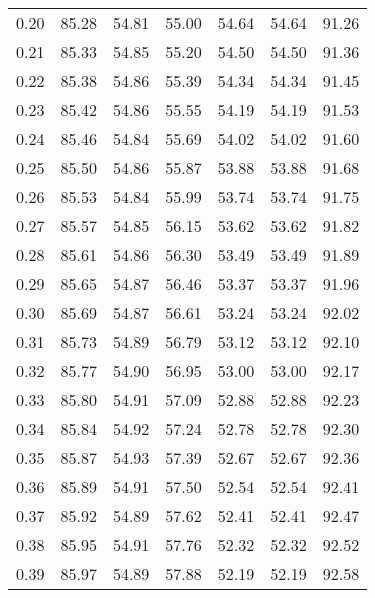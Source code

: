 \begin{tabular}{|c|c|c|c|c|c|c|}
      0.20 &     85.28 &     54.81 &      55.00 &   54.64 &      54.64 &         91.26 \\
      0.21 &     85.33 &     54.85 &      55.20 &   54.50 &      54.50 &         91.36 \\
      0.22 &     85.38 &     54.86 &      55.39 &   54.34 &      54.34 &         91.45 \\
      0.23 &     85.42 &     54.86 &      55.55 &   54.19 &      54.19 &         91.53 \\
      0.24 &     85.46 &     54.84 &      55.69 &   54.02 &      54.02 &         91.60 \\
      0.25 &     85.50 &     54.86 &      55.87 &   53.88 &      53.88 &         91.68 \\
      0.26 &     85.53 &     54.84 &      55.99 &   53.74 &      53.74 &         91.75 \\
      0.27 &     85.57 &     54.85 &      56.15 &   53.62 &      53.62 &         91.82 \\
      0.28 &     85.61 &     54.86 &      56.30 &   53.49 &      53.49 &         91.89 \\
      0.29 &     85.65 &     54.87 &      56.46 &   53.37 &      53.37 &         91.96 \\
      0.30 &     85.69 &     54.87 &      56.61 &   53.24 &      53.24 &         92.02 \\
      0.31 &     85.73 &     54.89 &      56.79 &   53.12 &      53.12 &         92.10 \\
      0.32 &     85.77 &     54.90 &      56.95 &   53.00 &      53.00 &         92.17 \\
      0.33 &     85.80 &     54.91 &      57.09 &   52.88 &      52.88 &         92.23 \\
      0.34 &     85.84 &     54.92 &      57.24 &   52.78 &      52.78 &         92.30 \\
      0.35 &     85.87 &     54.93 &      57.39 &   52.67 &      52.67 &         92.36 \\
      0.36 &     85.89 &     54.91 &      57.50 &   52.54 &      52.54 &         92.41 \\
      0.37 &     85.92 &     54.89 &      57.62 &   52.41 &      52.41 &         92.47 \\
      0.38 &     85.95 &     54.91 &      57.76 &   52.32 &      52.32 &         92.52 \\
      0.39 &     85.97 &     54.89 &      57.88 &   52.19 &      52.19 &         92.58 \\

\end{tabular}
